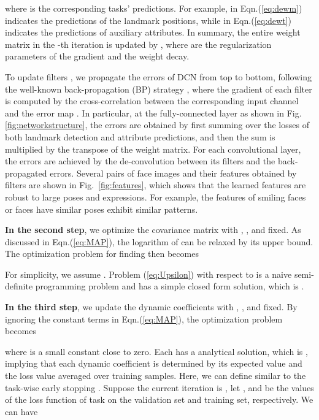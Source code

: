 \documentclass[10pt,journal,compsoc]{IEEEtran}
\begin{document}
where  is the corresponding tasks' predictions. For example,  in Eqn.(\ref{eq:dewm}) indicates the predictions of the landmark positions, while  in Eqn.(\ref{eq:dewt}) indicates the predictions of auxiliary attributes. In summary, the entire weight matrix in the -th iteration is updated by , where  are the regularization parameters of the gradient and the weight decay.

To update filters , we propagate the errors of DCN from top to bottom, following the well-known back-propagation (BP) strategy \cite{Rumelhart:1988}, where the gradient of each filter is computed by the cross-correlation between the corresponding input channel and the error map \cite{lecun1998gradient}. In particular, at the fully-connected layer as shown in Fig. \ref{fig:networkstructure}, the errors are obtained by first summing over the losses of both landmark detection and attribute predictions, and then the sum is multiplied by the transpose of the weight matrix. For each convolutional layer, the errors are achieved by the de-convolution \cite{lecun1998gradient} between its filters and the back-propagated errors. Several pairs of face images and their features obtained by filters  are shown in Fig.~\ref{fig:features}, which shows that the learned features are robust to large poses and expressions. For example, the features of smiling faces or faces have similar poses exhibit similar patterns.

\vspace{0.1cm}
\textbf{In the second step}, we optimize the covariance matrix  with , , and  fixed. As discussed in Eqn.(\ref{eq:MAP}), the logarithm of  can be relaxed by its upper bound. The optimization problem for finding  then becomes

For simplicity, we assume . Problem (\ref{eq:Upsilon}) with respect to  is a naive semi-definite programming problem and has a simple closed form solution, which is .



\vspace{0.1cm}
\textbf{In the third step}, we update the dynamic coefficients  with , , and  fixed. By ignoring the constant terms in Eqn.(\ref{eq:MAP}), the optimization problem becomes

where  is a small constant close to zero. Each  has a analytical solution, which is , implying that each dynamic coefficient is determined by its expected value and the loss value averaged over  training samples. Here, we can define  similar to the task-wise early stopping \cite{zhang2014facial}. Suppose the current iteration is , let , and  be the values of the loss function of task  on the validation set and training set, respectively. We can have
\end{document}
